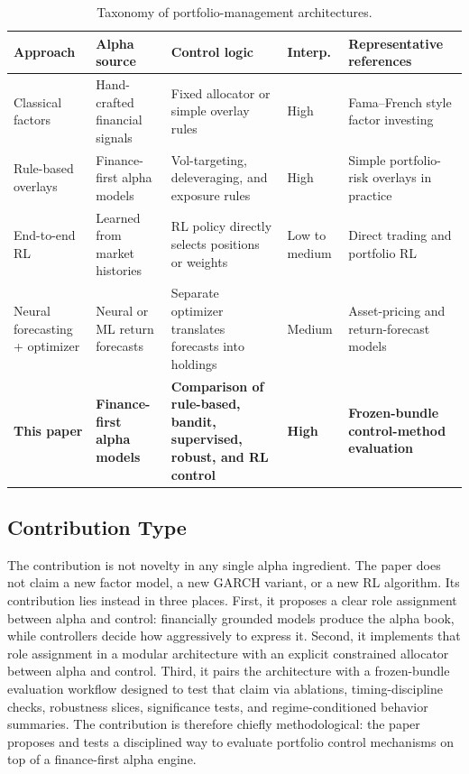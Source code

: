 \documentclass[11pt]{article}
\begin{document}
\begin{table}[H]
\centering
\scriptsize
\caption{Taxonomy of portfolio-management architectures.}
\label{tab:taxonomy}
\begin{tabular}{@{} >{\raggedright\arraybackslash}p{2.1cm}
                >{\raggedright\arraybackslash}p{2.1cm}
                >{\raggedright\arraybackslash}p{2.15cm}
                >{\raggedright\arraybackslash}p{1.45cm}
                >{\raggedright\arraybackslash}p{4.2cm} @{}}
\toprule
\textbf{Approach} & \textbf{Alpha source} & \textbf{Control logic} & \textbf{Interp.} & \textbf{Representative references} \\
\midrule
Classical factors & Hand-crafted financial signals & Fixed allocator or simple overlay rules & High & Fama--French style factor investing \cite{fama1993} \\
Rule-based overlays & Finance-first alpha models & Vol-targeting, deleveraging, and exposure rules & High & Simple portfolio-risk overlays in practice \cite{almgren2000} \\
End-to-end RL & Learned from market histories & RL policy directly selects positions or weights & Low to medium & Direct trading and portfolio RL \cite{moody2001,jiang2017,zhang2020,cong2021} \\
Neural forecasting + optimizer & Neural or ML return forecasts & Separate optimizer translates forecasts into holdings & Medium & Asset-pricing and return-forecast models \cite{gu2020,chen2021,giglio2022} \\
\textbf{This paper} & \textbf{Finance-first alpha models} & \textbf{Comparison of rule-based, bandit, supervised, robust, and RL control} & \textbf{High} & \textbf{Frozen-bundle control-method evaluation} \\
\bottomrule
\end{tabular}
\end{table}

\subsection{Contribution Type}

The contribution is not novelty in any single alpha ingredient. The paper does
not claim a new factor model, a new GARCH variant, or a new RL algorithm. Its
contribution lies instead in three places. First, it proposes a clear role
assignment between alpha and control: financially grounded models produce the
alpha book, while controllers decide how aggressively to express it. Second, it
implements that role assignment in a modular architecture with an explicit
constrained allocator between alpha and control. Third, it pairs the
architecture with a frozen-bundle evaluation workflow designed to test that
claim via ablations, timing-discipline checks, robustness slices, significance
tests, and regime-conditioned behavior summaries. The contribution is therefore
chiefly methodological: the paper proposes and tests a disciplined way to
evaluate portfolio control mechanisms on top of a finance-first alpha engine.
\end{document}
